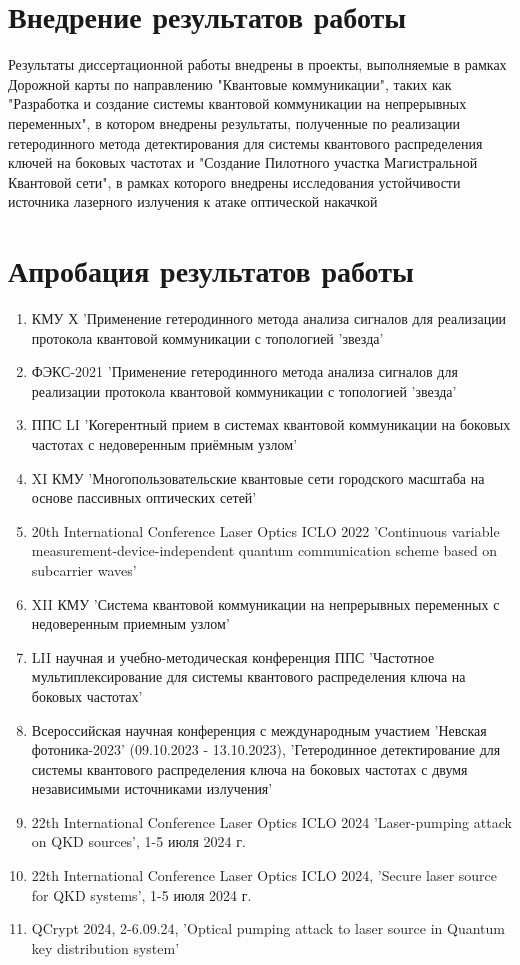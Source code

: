 \section*{Внедрение результатов работы}
Результаты диссертационной работы внедрены в проекты, выполняемые в рамках Дорожной карты по направлению "Квантовые коммуникации", таких как  "Разработка и создание системы квантовой коммуникации на непрерывных переменных", в котором внедрены результаты, полученные по реализации гетеродинного метода детектирования для системы квантового распределения ключей на боковых частотах  и "Создание Пилотного участка Магистральной Квантовой сети", в рамках которого внедрены исследования устойчивости источника лазерного излучения к атаке оптической накачкой

\section*{Апробация результатов работы}
\begin{enumerate}
    \item КМУ Х 'Применение гетеродинного метода анализа сигналов для реализации протокола квантовой коммуникации с топологией 'звезда'
    \item ФЭКС-2021 'Применение гетеродинного метода анализа сигналов для реализации протокола квантовой коммуникации с топологией 'звезда'
    \item ППС LI 'Когерентный прием в системах квантовой коммуникации на боковых частотах с недоверенным приёмным узлом'
    \item XI КМУ 'Многопользовательские квантовые сети городского масштаба на основе пассивных оптических сетей'
    \item 20th International Conference Laser Optics ICLO 2022 'Continuous variable measurement-device-independent quantum communication scheme based on subcarrier waves'
    \item XII КМУ 'Система квантовой коммуникации на непрерывных переменных с недоверенным приемным узлом'
    \item LII научная и учебно-методическая конференция ППС 'Частотное мультиплексирование для системы квантового распределения ключа на боковых частотах'
    \item Всероссийская научная конференция с международным участием 'Невская фотоника-2023' (09.10.2023 - 13.10.2023), 'Гетеродинное детектирование для системы квантового распределения ключа на боковых частотах с двумя независимыми источниками излучения'
    \item 22th International Conference Laser Optics ICLO 2024 'Laser-pumping attack on QKD sources', 1-5 июля 2024 г.
    \item 22th International Conference Laser Optics ICLO 2024, 'Secure laser source for QKD systems', 1-5 июля 2024 г.
    \item QCrypt 2024, 2-6.09.24, 'Optical pumping attack to laser source in Quantum key distribution system'
\end{enumerate}
